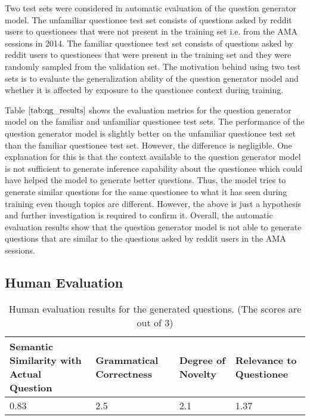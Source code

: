 \documentclass[paper=a4, fontsize=11pt]{scrartcl}
\numberwithin{equation}{section}		%
\numberwithin{figure}{section}			%
\numberwithin{table}{section}				%
\begin{document}
Two test sets were considered in automatic evaluation of the question generator model.
The unfamiliar questionee test set consists of questions asked by reddit users to questionees that were not present in the training set i.e. from the AMA sessions in 2014.
The familiar questionee test set consists of questions asked by reddit users to questionees that were present in the training set and they were randomly sampled from the validation set.
The motivation behind using two test sets is to evaluate the generalization ability of the question generator model and whether it is affected by exposure to the questionee context during training.

Table $\ref{tab:qg_results}$ shows the evaluation metrics for the question generator model on the familiar and unfamiliar questionee test sets. 
The performance of the question generator model is slightly better on the unfamiliar questionee test set than the familiar questionee test set.
However, the difference is negligible.
One explanation for this is that the context available to the question generator model is not sufficient to generate inference capability about the questionee which could have helped the model to generate better questions.
Thus, the model tries to generate similar questions for the same questionee to what it has seen during training even though topics are different.
However, the above is just a hypothesis and further investigation is required to confirm it.
Overall, the automatic evaluation results show that the question generator model is not able to generate questions that are similar to the questions asked by reddit users in the AMA sessions.

\subsection*{Human Evaluation}
\begin{table}
  \small
  \centering
  \begin{tabular}{p{2cm}p{2cm}p{2cm}p{2cm}}
    \hline
    \textbf{Semantic Similarity with Actual Question} &	\textbf{Grammatical Correctness} &	\textbf{Degree of Novelty} &	\textbf{Relevance to Questionee} \\
    \hline
    0.83 &	2.5	& 2.1 &	1.37 \\
    \hline
  \end{tabular}
  \caption{Human evaluation results for the generated questions. (The scores are out of 3)}
  \label{tab:human_eval}
\end{table}
\end{document}
